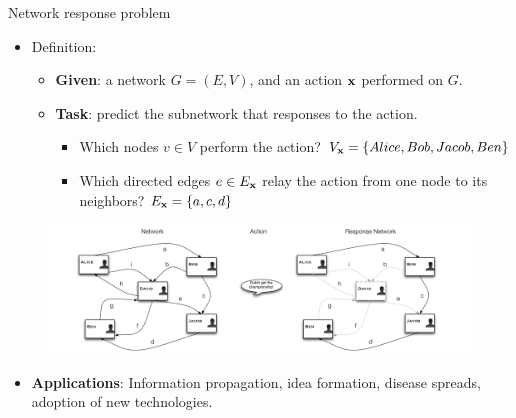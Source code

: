 \documentclass[first=dgreen,second=purple,logo=red]{aaltoslides}
\begin{document}
\begin{frame}{Network response problem}
	\begin{itemize}\footnotesize
		\item Definition:
		\begin{itemize}\footnotesize
			\item {\bf Given}: a network $G=(E,V)$, and an action $\mathbf {x}$ performed on $G$.
			\item {\bf Task}: predict the subnetwork that responses to the action.
			\begin{itemize}\footnotesize
				\item Which nodes $v\in V$ perform the action? $V_{\mathbf {x}}=\{Alice,Bob,Jacob,Ben\}$
				\item Which directed edges $e\in E_{\mathbf {x}}$ relay the action from one node to its neighbors? $E_{\mathbf {x}}=\{a,c,d\}$
			\end{itemize}
		\end{itemize}
	\end{itemize}
	\vspace{-7mm}
	\begin{figure}
		\center
		\includegraphics[scale=0.25]{./figures/problem_definition.pdf}
	\end{figure}
	\begin{itemize}
		\item {\bf Applications}: Information propagation, idea formation, disease spreads, adoption of new technologies. 
	\end{itemize}
\end{frame}
\end{document}

